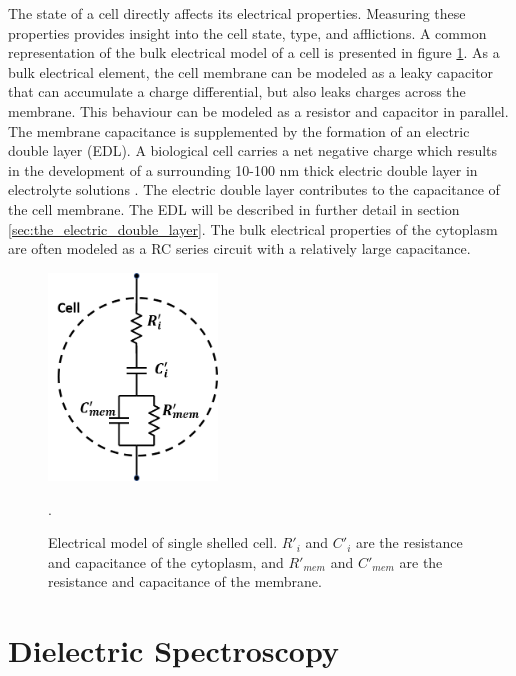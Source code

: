 \par The state of a cell directly affects its electrical properties. Measuring these properties provides insight into the cell state, type, and afflictions. A common representation of the bulk electrical model of a cell is presented in figure \ref{fig:electric_model_cell}. As a bulk electrical element, the cell membrane can be modeled as a leaky capacitor that can accumulate a charge differential, but also leaks charges across the membrane. This behaviour can be modeled as a resistor and capacitor in parallel. The membrane capacitance is supplemented by the formation of an electric double layer (EDL). A biological cell carries a net negative charge which results in the development of a surrounding 10-100 nm thick electric double layer in electrolyte solutions \cite{swaminathan_effect_2009}. The electric double layer contributes to the capacitance of the cell membrane. The EDL will be described in further detail in section \ref{sec:the_electric_double_layer}. The bulk electrical properties of the cytoplasm are often modeled as a RC series circuit with a relatively large capacitance. 

\begin{figure}[h]
    \centering
    \includegraphics[width=0.4\textwidth]{images/completeCellCircuit.png}
    \caption[Electrical model of single shelled cell.]{Electrical model of single shelled cell. $R'_i$ and $C'_i$ are the resistance and capacitance of the cytoplasm, and $R'_{mem}$ and $C'_{mem}$ are the resistance and capacitance of the membrane.}
    \label{fig:electric_model_cell}.
\end{figure}
 
 \section{Dielectric Spectroscopy}

